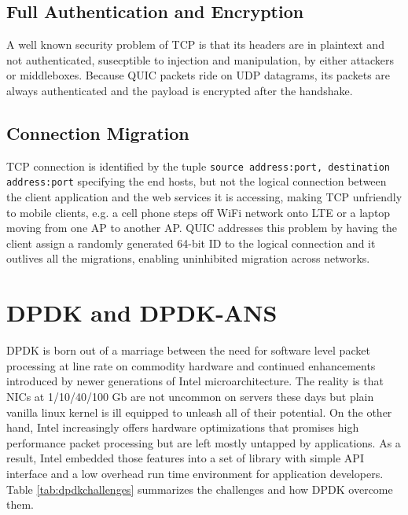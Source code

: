\documentclass{sig-alternate-05-2015}
\begin{document}
\subsection{Full Authentication and Encryption}
A well known security problem of TCP is that its headers are in plaintext and not authenticated, susecptible to injection and manipulation, by either attackers or middleboxes. Because QUIC packets ride on UDP datagrams, its packets are always authenticated and the payload is encrypted after the handshake. \cite{quic:draft}

\subsection{Connection Migration}
TCP connection is identified by the tuple \texttt{source address:port, destination address:port} specifying the end hosts, but not the logical connection between the client application and the web services it is accessing, making TCP unfriendly to mobile clients, e.g. a cell phone steps off WiFi network onto LTE or a laptop moving from one AP to another AP. QUIC addresses this problem by having the client assign a randomly generated 64-bit ID to the logical connection and it outlives all the migrations, enabling uninhibited migration across networks. \cite{quic:draft}

\section{DPDK and DPDK-ANS}
DPDK is born out of a marriage between the need for software level packet processing at line rate on commodity hardware and continued enhancements introduced by newer generations of Intel microarchitecture. The reality is that NICs at 1/10/40/100 Gb are not uncommon on servers these days but plain vanilla linux kernel is ill equipped to unleash all of their potential. On the other hand, Intel increasingly offers hardware optimizations that promises high performance packet processing but are left mostly untapped by applications. As a result, Intel embedded those features into a set of library with simple API interface and a low overhead run time environment for application developers. Table \ref{tab:dpdkchallenges} summarizes the challenges and how DPDK overcome them. \cite{dpdk:presentation}
\end{document}
